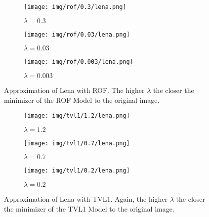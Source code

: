\documentclass{scrreprt}
\begin{document}
    \begin{figure}[ht]
        \centering
        \begin{subfigure}[b]{0.3\textwidth}
            \texttt{[image: img/rof/0.3/lena.png]}
            \caption{$\lambda = 0.3$}
            \label{fig:rof_0.3_lena}
        \end{subfigure}
        \begin{subfigure}[b]{0.3\textwidth}
            \texttt{[image: img/rof/0.03/lena.png]}
            \caption{$\lambda = 0.03$}
            \label{fig:rof_0.03_lena}
        \end{subfigure}
        \begin{subfigure}[b]{0.3\textwidth}
            \texttt{[image: img/rof/0.003/lena.png]}
            \caption{$\lambda = 0.003$}
            \label{fig:rof_0.003_lena}
        \end{subfigure}
        \caption{Approximation of Lena with ROF. The higher $\lambda$ the closer the minimizer of the ROF Model to the original image.}
        \label{fig:rof_lena_compare}
    \end{figure}

    \begin{figure}[ht]
        \centering
        \begin{subfigure}[b]{0.3\textwidth}
            \texttt{[image: img/tvl1/1.2/lena.png]}
            \caption{$\lambda = 1.2$}
            \label{fig:tvl1_1.2_lena}
        \end{subfigure}
        \begin{subfigure}[b]{0.3\textwidth}
            \texttt{[image: img/tvl1/0.7/lena.png]}
            \caption{$\lambda = 0.7$}
            \label{fig:tvl1_0.7_lena}
        \end{subfigure}
        \begin{subfigure}[b]{0.3\textwidth}
            \texttt{[image: img/tvl1/0.2/lena.png]}
            \caption{$\lambda = 0.2$}
            \label{fig:tvl1_0.2_lena}
        \end{subfigure}
        \caption{Approximation of Lena with TVL1. Again, the higher $\lambda$ the closer the minimizer of the TVL1 Model to the original image.}
        \label{fig:tvl1_lena_compare}
    \end{figure}
\end{document}
